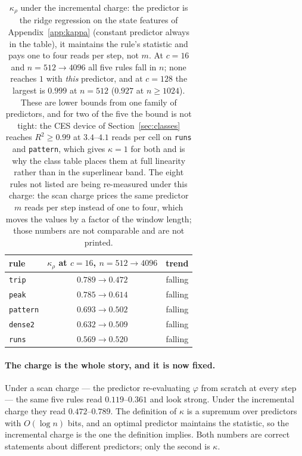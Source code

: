\documentclass[11pt]{article}
\theoremstyle{remark}
\begin{document}
\begin{table}[htbp]
\centering
\footnotesize
\begin{tabular}{@{}lcc@{}}
\toprule
rule & $\kappa_{\rho}$ at $c=16$, $n=512\to4096$ & trend \\
\midrule
\texttt{trip}     & $0.789\to0.472$ & falling \\
\texttt{peak}     & $0.785\to0.614$ & falling \\
\texttt{pattern}  & $0.693\to0.502$ & falling \\
\texttt{dense2}   & $0.632\to0.509$ & falling \\
\texttt{runs}     & $0.569\to0.520$ & falling \\
\bottomrule
\end{tabular}
\label{tab:kappa-inc}
\caption{$\kappa_{\rho}$ under the incremental charge: the predictor is the ridge regression on the
state features of Appendix~\ref{app:kappa} (constant predictor always in the table), it maintains
the rule's statistic and pays one to four reads per step, not $m$. At $c=16$ and $n=512\to4096$ all five rules fall in
$n$; none reaches $1$ with \emph{this} predictor, and at $c=128$ the largest is $0.999$ at $n=512$ ($0.927$ at $n\ge1024$). These are
lower bounds from one family of predictors, and for two of the five the bound is not tight: the CES
device of Section~\ref{sec:classes} reaches $R^{2}\ge0.99$ at $3.4$--$4.1$ reads per cell on
\texttt{runs} and \texttt{pattern}, which gives $\kappa=1$ for both and is why the class table places them at full linearity rather
than in the superlinear band. The eight rules not listed are being re-measured under this charge:
the scan charge prices the same predictor $m$ reads per step instead of one to four, which moves
the values by a factor of the window length; those numbers are not comparable and are not printed.}
\end{table}

\paragraph{The charge is the whole story, and it is now fixed.} Under a scan charge --- the predictor
re-evaluating $\varphi$ from scratch at every step --- the same five rules read $0.119$--$0.361$ and
look strong. Under the incremental charge they read $0.472$--$0.789$. The definition of $\kappa$ is a
supremum over predictors with $O(\log n)$ bits, and an optimal predictor maintains the statistic, so
the incremental charge is the one the definition implies. Both numbers are correct statements about
different predictors; only the second is $\kappa$.
\end{document}
